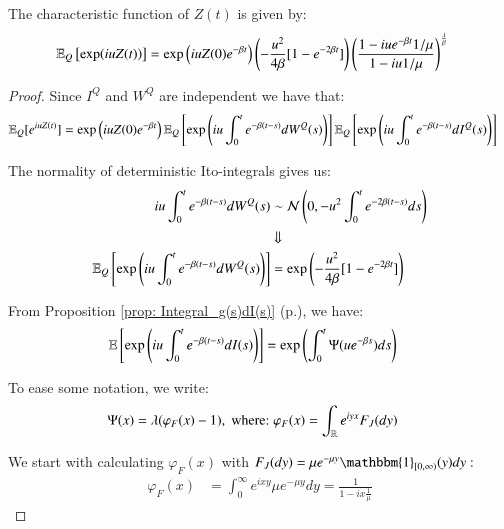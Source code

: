 \newpage 

\begin{proposition}
\label{prop: Characteristic_function_ESG_risk_score}
The characteristic function of $Z(t)$ is given by:
\begin{align*}
\mathbb{E}_{Q}\left[
\exp(iu Z(t))
\right] 
&= 
\exp\left(
iuZ(0)e^{-\beta t}\right)
\left(
-\frac{u^{2}}{4\beta}[1-e^{-2\beta t}]
\right)
\left(
\frac{
1-iue^{-\beta t}1/\mu}
{
1-iu1/\mu
}
\right)^{\frac{\lambda}{\beta}}    
\end{align*}
\end{proposition}

\begin{proof}
Since $I^{Q}$ and $W^{Q}$ are independent we have that: 
\begin{align*}
\mathbb{E}_{Q}[e^{iuZ(t)}]
&= 
\exp\left(
iuZ(0)e^{-\beta t}
\right)
\mathbb{E}_{Q}\left[
\exp\left(
iu\int_{0}^{t}e^{-\beta(t-s)}dW^{Q}(s)
\right)
\right]
\mathbb{E}_{Q}\left[
\exp\left(
iu\int_{0}^{t}e^{-\beta(t-s)}dI^{Q}(s)
\right)
\right]
\end{align*}

The normality of deterministic Ito-integrals gives us:
\begin{align*}
iu\int_{0}^{t}e^{-\beta(t-s)}dW^{Q}(s) &\sim \mathcal{N}\left(
0, -u^{2}\int_{0}^{t}e^{-2\beta(t-s)}ds
\right) \\ 
&\Downarrow \\ 
\mathbb{E}_{Q}\left[
\exp\left(
iu\int_{0}^{t}e^{-\beta(t-s)}dW^{Q}(s)
\right)
\right]
&= 
\exp\left(
-\frac{u^{2}}{4\beta}[1-e^{-2\beta t}]
\right)
\end{align*}

From Proposition \ref{prop: Integral_g(s)dI(s)} (p.\pageref{prop: Integral_g(s)dI(s)}), we have: 
\begin{align*}
\mathbb{E}\left[
\exp\left(iu\int_{0}^{t}e^{-\beta(t-s)}dI(s)\right)
\right] 
&= 
\exp\left(
\int_{0}^{t}\Psi(ue^{-\beta s})ds
\right)
\end{align*}

To ease some notation, we write:
\begin{align*}
\Psi(x) &= \lambda(\varphi_{F}(x) - 1), \;\text{where:}\; 
\varphi_{F}(x) = \int_{\mathbb{R}}e^{iyx}F_{J}(dy) 
\end{align*}

We start with calculating $\varphi_{F}(x)$ with $F_{J}(dy) = 
\mu e^{-\mu y}\mathbbm{1}_{[0,\infty)}(y)dy:$ 
\begin{align*}
\varphi_{F}(x) &= 
\int_{0}^{\infty}e^{ixy}\mu e^{-\mu y}dy   
= \frac{1}{1-ix\frac{1}{\mu}}
\end{align*}


\end{proof}
